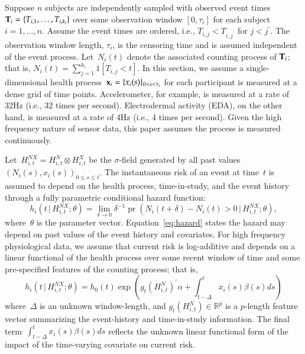 \documentclass[11pt]{amsart}
\def\pr{\mathop{\text{pr}}\nolimits}
\def\pr{\mathop{\text{pr}}\nolimits}
\def\given{\, | \,}
\def\Given{\, \big | \,}
\def\bfx{{\bf x}}
\def\bfT{{\bf T}}
\begin{document}
Suppose $n$ subjects are independently sampled with observed event
times~$\bfT_{i} = \{ T_{i,1}, \ldots, T_{i,k_i}\}$ over some observation
window $[0, \tau_i]$ for each subject $i = 1,\ldots, n$.  Assume the
event times are ordered, i.e., $T_{i,j} < T_{i,j^\prime}$ for $j <
j^\prime$. The observation window length, $\tau_i$, is the censoring
time and is assumed independent of the event process. Let~$N_{i} (t)$
denote the associated counting process of $\bfT_{i}$; that is, $N_i
(t) = \sum_{j=1}^{k_i} 1 [ T_{i,j} < t ]$.  
In this section, we assume a single-dimensional health process~$\bfx_i
= \{ x_i (s) \}_{0 < s < \tau_i}$ for each participant is measured at
a dense grid of time points.  Accelerometer, for example, is measured
at a rate of 32Hz (i.e., $32$ times per second). Electrodermal
activity (EDA), on the other hand, is measured at a rate of 4Hz (i.e.,
4 times per second).  Given the high frequency nature of sensor data,
this paper assumes the process is measured continuously.   

Let~$H_{i,t}^{NX} = H_{i,t}^{N} \otimes H_{i,t}^{X}$ be the $\sigma$-field
generated by all past values~$(N_i (s), x_i (s))_{0 \leq s \leq t}$.
The instantaneous risk of an event at time~$t$ is assumed to depend on
the health process, time-in-study, and the event history through a
fully parametric conditional hazard function:
\begin{equation}
\label{eq:hazard}
h_i \left( t \Given H_{i,t}^{NX} ; \theta \right) =
\lim_{\delta \to 0} \delta^{-1} \pr \left( N_i(t+\delta) - N_i(t) > 0
  \given H_{i,t}^{NX}; \theta \right), 
\end{equation}
where~$\theta$ is the parameter vector. Equation~\eqref{eq:hazard}
states the hazard may depend on past values of the event history and
covariates.  For high frequency physiological data, we assume that 
current risk is log-additive and depends on a linear functional of the
health process over some recent window of time and some pre-specified
features of the counting process; that is,  
\begin{equation}
\label{eq:hazardlinear}
h_i \left( t \given  H_{i,t}^{NX} ; \theta \right) = 
h_0 (t) \exp \left( g_t \left( H_{i,t}^{N} \right)^{\prime} \alpha
  + \int_{t-\Delta}^t x_i (s) \beta(s) ds  \right)
\end{equation}
where~$\Delta$ is an unknown window-length, and $g_t( H_{i,t}^N ) \in
\mathbb{R}^p$ is a $p$-length feature vector summarizing the
event-history and time-in-study information. The final
term~$\int_{t-\Delta}^t x_i(s) \beta(s) ds$ reflects the unknown
linear functional form of the impact of the time-varying covariate on
current risk.   
\end{document}

